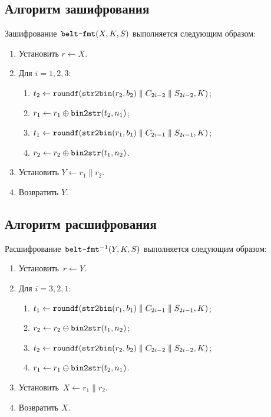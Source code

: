 \subsection{Алгоритм зашифрования}

Зашифрование~$\texttt{belt-fmt}(X,K,S)$ выполняется следующим образом:
\begin{enumerate}
\item
Установить $r\leftarrow X$.
\item
Для $i=1,2,3$:
\begin{enumerate}
\item
$t_2\leftarrow
\texttt{roundf}(\texttt{str2bin}(r_2,b_2)\parallel C_{2i-2}\parallel S_{2i-2},K)$;
\item
$r_1\leftarrow r_1\oplus\texttt{bin2str}(t_2,n_1)$;
\item
$t_1\leftarrow 
\texttt{roundf}(\texttt{str2bin}(r_1,b_1)\parallel C_{2i-1}\parallel S_{2i-1},K)$; 
\item
$r_2\leftarrow r_2\oplus\texttt{bin2str}(t_1,n_2)$.
\end{enumerate}
\item
Установить $Y\leftarrow r_1\parallel r_2$.
\item
Возвратить $Y$.
\end{enumerate}

\subsection{Алгоритм расшифрования}

Расшифрование~$\texttt{belt-fmt}^{-1}(Y,K,S)$ выполняется следующим образом:
\begin{enumerate}
\item
Установить~$r\leftarrow Y$.
\item
Для $i=3,2,1$:
\begin{enumerate}
\item
$t_1\leftarrow 
\texttt{roundf}(\texttt{str2bin}(r_1,b_1)\parallel C_{2i-1}\parallel S_{2i-1},K)$;
\item
$r_2\leftarrow r_2\ominus \texttt{bin2str}(t_1,n_2)$;
\item
$t_2\leftarrow 
\texttt{roundf}(\texttt{str2bin}(r_2,b_2)\parallel C_{2i-2}\parallel S_{2i-2},K)$;
\item
$r_1\leftarrow r_1\ominus \texttt{bin2str}(t_2,n_1)$.
\end{enumerate}
\item
Установить~$X\leftarrow r_1\parallel r_2$.
\item
Возвратить $X$.
\end{enumerate}


